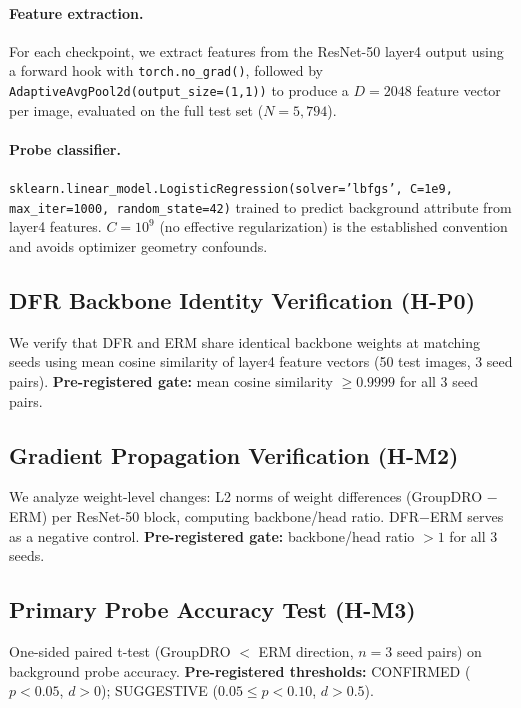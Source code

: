 \paragraph{Feature extraction.} For each checkpoint, we extract features from the ResNet-50 layer4 output using a forward hook with \texttt{torch.no\_grad()}, followed by \texttt{AdaptiveAvgPool2d(output\_size=(1,1))} to produce a $D=2048$ feature vector per image, evaluated on the full test set ($N=5{,}794$).

\paragraph{Probe classifier.} \texttt{sklearn.linear\_model.LogisticRegression(solver='lbfgs', C=1e9, max\_iter=1000, random\_state=42)} trained to predict background attribute from layer4 features. $C=10^9$ (no effective regularization) is the established convention \cite{kirichenko2022last,murotkar2024identifying} and avoids optimizer geometry confounds.

\subsection{DFR Backbone Identity Verification (H-P0)}

We verify that DFR and ERM share identical backbone weights at matching seeds using mean cosine similarity of layer4 feature vectors (50 test images, 3 seed pairs). \textbf{Pre-registered gate:} mean cosine similarity $\geq 0.9999$ for all 3 seed pairs.

\subsection{Gradient Propagation Verification (H-M2)}

We analyze weight-level changes: L2 norms of weight differences (GroupDRO $-$ ERM) per ResNet-50 block, computing backbone/head ratio. DFR$-$ERM serves as a negative control. \textbf{Pre-registered gate:} backbone/head ratio $> 1$ for all 3 seeds.

\subsection{Primary Probe Accuracy Test (H-M3)}

One-sided paired t-test (GroupDRO $<$ ERM direction, $n = 3$ seed pairs) on background probe accuracy. \textbf{Pre-registered thresholds:} CONFIRMED ($p < 0.05$, $d > 0$); SUGGESTIVE ($0.05 \leq p < 0.10$, $d > 0.5$).

